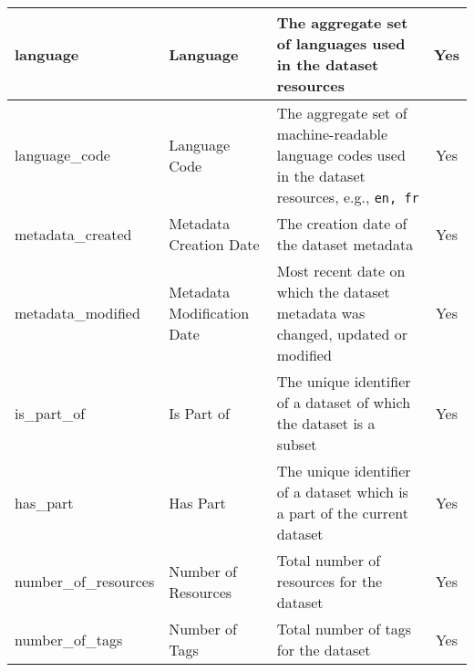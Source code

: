 \begin{center}
{\begin{longtable}[h]{|l|p{2cm}|p{9cm}|c|}
language                          & Language                         & The aggregate set of languages used in the dataset resources                                                                                                                                                            & Yes                                 \\ \hline
language\_code                    & Language Code                    & The aggregate set of machine-readable language codes used in the dataset resources, e.g., \texttt{en, fr}                                                                                                             & Yes                                 \\ \hline
metadata\_created                 & Metadata Creation Date           & The creation date of the dataset metadata                                                                                                                                                                               & Yes                                 \\ \hline
metadata\_modified                & Metadata Modification Date       & Most recent date on which the dataset metadata was changed, updated or modified                                                                                                                                         & Yes                                 \\ \hline
is\_part\_of                      & Is Part of                       & The unique identifier of a dataset of which the dataset is a subset                                                                                                                                                     & Yes                                 \\ \hline
has\_part                         & Has Part                         & The unique identifier of a dataset which is a part of the current dataset                                                                                                                                               & Yes                                 \\ \hline
number\_of\_resources             & Number of Resources              & Total number of resources for the dataset                                                                                                                                                                               & Yes                                 \\ \hline
number\_of\_tags                  & Number of Tags                   & Total number of tags for the dataset                                                                                                                                                                                    & Yes                                 \\ \hline


\end{longtable}}
\end{center}
